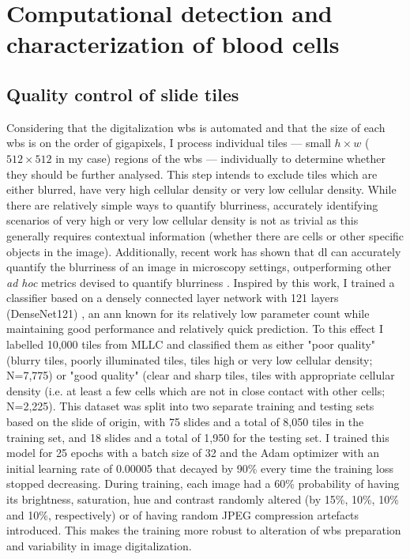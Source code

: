 \section{Computational detection and characterization of blood cells}

\subsection{Quality control of slide tiles}

Considering that the digitalization \ac{wbs} is automated and that the size of each \ac{wbs} is on the order of gigapixels, I process individual tiles --- small $h \times w$ ($512 \times 512$ in my case) regions of the \ac{wbs} --- individually to determine whether they should be further analysed. This step intends to exclude tiles which are either blurred, have very high cellular density or very low cellular density. While there are relatively simple ways to quantify blurriness, accurately identifying scenarios of very high or very low cellular density is not as trivial as this generally requires contextual information (whether there are cells or other specific objects in the image). Additionally, recent work has shown that \ac{dl} can accurately quantify the blurriness of an image in microscopy settings, outperforming other \textit{ad hoc} metrics devised to quantify blurriness \cite{Yang2018-ve}. Inspired by this work, I trained a classifier based on a densely connected layer network with 121 layers (DenseNet121) \cite{huang2017densely}, an \ac{ann} known for its relatively low parameter count while maintaining good performance and relatively quick prediction. To this effect I labelled 10,000 tiles from MLLC and classified them as either "poor quality" (blurry tiles, poorly illuminated tiles, tiles high or very low cellular density; N=7,775) or "good quality" (clear and sharp tiles, tiles with appropriate cellular density (i.e. at least a few cells which are not in close contact with other cells; N=2,225). This dataset was split into two separate training and testing sets based on the slide of origin, with 75 slides and a total of 8,050 tiles in the training set, and 18 slides and a total of 1,950 for the testing set. I trained this model for 25 epochs with a batch size of 32 and the Adam optimizer with an initial learning rate of 0.00005 that decayed by 90\% every time the training loss stopped decreasing. During training, each image had a 60\% probability of having its brightness, saturation, hue and contrast randomly altered (by 15\%, 10\%, 10\% and 10\%, respectively) or of having random JPEG compression artefacts introduced. This makes the training more robust to alteration of \ac{wbs} preparation and variability in image digitalization.

